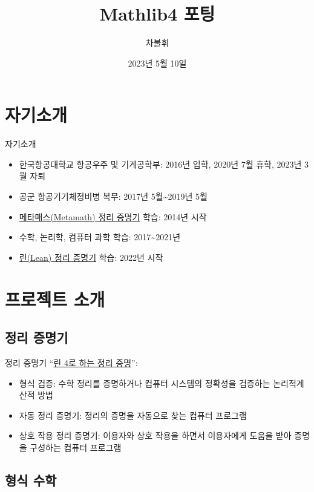 \documentclass{beamer}
\title{Mathlib4 포팅}
\author{차불휘}
\date{2023년 5월 10일}
\begin{document}
\frame{\titlepage}

\section{자기소개}

\begin{frame}{자기소개}
  \begin{itemize}
    \item 한국항공대학교 항공우주 및 기계공학부: 2016년 입학, 2020년 7월 휴학, 2023년
          3월 자퇴
    \item 공군 항공기기체정비병 복무: 2017년 5월\textasciitilde2019년 5월
    \item \href{https://us.metamath.org/index.html}{메타매스(Metamath) 정리
          증명기} 학습: 2014년 시작
    \item 수학, 논리학, 컴퓨터 과학 학습: 2017\textasciitilde2021년
    \item \href{https://leanprover.github.io/}{린(Lean) 정리 증명기} 학습: 2022년
          시작
  \end{itemize}
\end{frame}

\section{프로젝트 소개}

\subsection{정리 증명기}

\begin{frame}{정리 증명기}
  \textquotedblleft \href{https://leanprover.github.io/theorem_proving_in_lean4/introduction.html}
  {린 4로 하는 정리 증명}\textquotedblright \autocite{tpil4}:
  \begin{itemize}
    \item 형식 검증: 수학 정리를 증명하거나 컴퓨터 시스템의 정확성을 검증하는
          논리적\textperiodcentered 계산적 방법
    \item 자동 정리 증명기: 정리의 증명을 자동으로 찾는 컴퓨터 프로그램
    \item 상호 작용 정리 증명기: 이용자와 상호 작용을 하면서 이용자에게 도움을
          받아 증명을 구성하는 컴퓨터 프로그램
  \end{itemize}
\end{frame}

\subsection{형식 수학}
\end{document}
